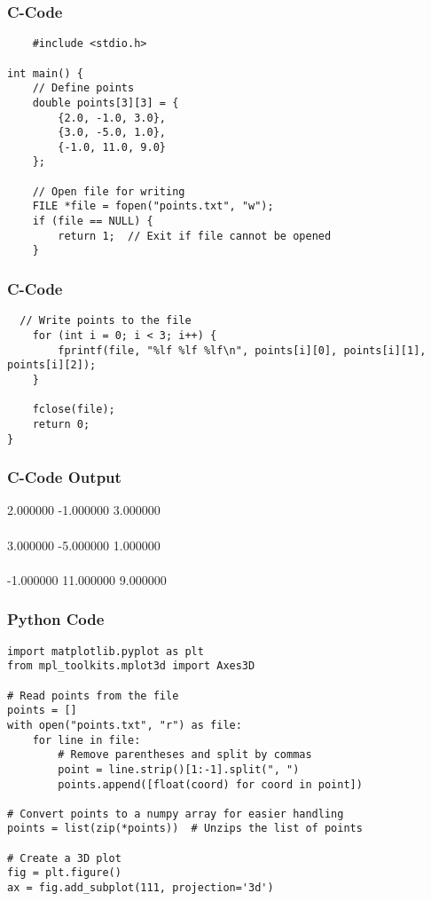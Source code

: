 \documentclass{beamer}
\theoremstyle{remark}
\numberwithin{equation}{section}
\begin{document}
\begin{frame}[fragile]
\frametitle{C-Code}
\begin{verbatim}
    #include <stdio.h>

int main() {
    // Define points
    double points[3][3] = {
        {2.0, -1.0, 3.0},
        {3.0, -5.0, 1.0},
        {-1.0, 11.0, 9.0}
    };

    // Open file for writing
    FILE *file = fopen("points.txt", "w");
    if (file == NULL) {
        return 1;  // Exit if file cannot be opened
    }
\end{verbatim}
\end{frame}
\begin{frame}[fragile]
\frametitle{C-Code}
\begin{verbatim}
  // Write points to the file
    for (int i = 0; i < 3; i++) {
        fprintf(file, "%lf %lf %lf\n", points[i][0], points[i][1], points[i][2]);
    }

    fclose(file);
    return 0;
}
\end{verbatim}
\end{frame}
\begin{frame}
\frametitle{C-Code Output}
2.000000 -1.000000 3.000000 \\\\
3.000000 -5.000000 1.000000 \\\\
-1.000000 11.000000 9.000000 
\end{frame}

\begin{frame}[fragile]
\frametitle{Python Code}
\begin{verbatim}
import matplotlib.pyplot as plt
from mpl_toolkits.mplot3d import Axes3D

# Read points from the file
points = []
with open("points.txt", "r") as file:
    for line in file:
        # Remove parentheses and split by commas
        point = line.strip()[1:-1].split(", ")
        points.append([float(coord) for coord in point])

# Convert points to a numpy array for easier handling
points = list(zip(*points))  # Unzips the list of points

# Create a 3D plot
fig = plt.figure()
ax = fig.add_subplot(111, projection='3d')
\end{verbatim}
\end{frame}
\end{document}
